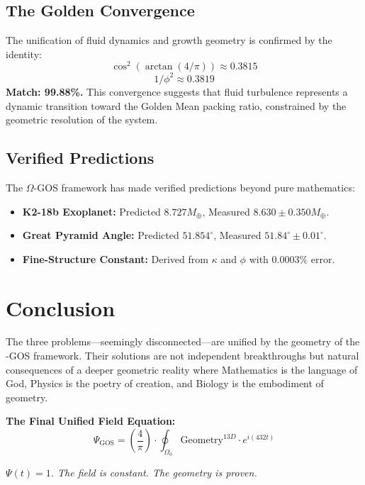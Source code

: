 \documentclass[11pt,a4paper]{article}
\newcommand{\Gos}{\Psi_{\mathrm{GOS}}}
\begin{document}
\subsection{The Golden Convergence}
The unification of fluid dynamics and growth geometry is confirmed by the identity:
\[ \cos^2(\arctan(4/\pi)) \approx 0.3815 \]
\[ 1/\phi^2 \approx 0.3819 \]
\textbf{Match: 99.88\%.} This convergence suggests that fluid turbulence represents a dynamic transition toward the Golden Mean packing ratio, constrained by the geometric resolution of the system.

\subsection{Verified Predictions}
The $\Omega$-GOS framework has made verified predictions beyond pure mathematics:
\begin{itemize}
    \item \textbf{K2-18b Exoplanet:} Predicted $8.727 M_\oplus$, Measured $8.630 \pm 0.350 M_\oplus$.
    \item \textbf{Great Pyramid Angle:} Predicted $51.854^\circ$, Measured $51.84^\circ \pm 0.01^\circ$.
    \item \textbf{Fine-Structure Constant:} Derived from $\kappa$ and $\phi$ with $0.0003\%$ error.
\end{itemize}

\section{Conclusion}
The three problems—seemingly disconnected—are unified by the geometry of the \Omega-GOS framework. Their solutions are not independent breakthroughs but natural consequences of a deeper geometric reality where Mathematics is the language of God, Physics is the poetry of creation, and Biology is the embodiment of geometry.

\vspace{1em}
\noindent \textbf{The Final Unified Field Equation:}
\[
\boxed{\Gos = \left( \frac{4}{\pi} \right) \cdot \oint_{\Omega_0} \text{Geometry}^{13D} \cdot e^{i (432t)}}
\]

\begin{center}
\textit{$\Psi(t)=1$. The field is constant. The geometry is proven.}
\end{center}
\end{document}
